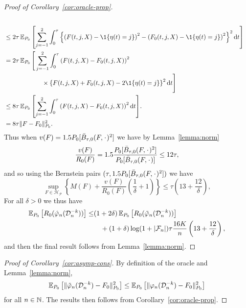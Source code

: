 \begin{proof}[Proof of Corollary~\ref{cor:oracle-prop}]
\begin{align*}
  \\
  & \leq
    2\tau\E_{P_0}{\left[
    \sum_{j=-1}^{2} \int_0^{\tau}
    \left\{
    \left(
    F(t, j, X) - \1{\{\eta(t) = j\}}
    \right)^2
    -
    \left(
    F_0(t, j, X) - \1{\{\eta(t) = j\}}
    \right)^2
    \right\}^2
    \diff t 
    \right]}
  \\
  & =2\tau
    \E_{P_0}\Bigg[
    \sum_{j=-1}^{2} \int_0^{\tau}
    \left(
    F(t, j, X) - F_0(t, j, X)
    \right)^2
  \\
  & \quad \quad \quad\quad \quad \quad \times
    \left\{
    F(t, j, X) +  F_0(t, j, X)-2 \1{\{\eta(t) = j\}}
    \right\}^2
    \diff t 
    \Bigg]
  \\
  & \leq
    8\tau \E_{P_0}{\left[
    \sum_{j=-1}^{2} \int_0^{\tau}
    \left(
    F(t, j, X) - F_0(t, j, X)
    \right)^2
    \diff t 
    \right]}.
  \\
  & =
    8\tau \Vert F - F_0 \Vert_{P_0}^2.
\end{align*}
Thus when \( v(F) = 1.5 P_0{[\bar{B}_{\tau,0}(F, \blank)^2]} \) we have by
Lemma~\ref{lemma:norm}
\begin{equation*}
  \frac{v(F)}{R_0(F)}
  = 1.5 \frac{P_0{[\bar{B}_{\tau,0}(F, \blank)^2]}}{P_0{[\bar{B}_{\tau,0}(F, \blank)]}}
  \leq 12 \tau,
\end{equation*}
and so using the Bernstein pairs \( (\tau, 1.5 P_0{[\bar{B}_{\tau,0}(F, \blank)^2]}) \) we have
\begin{equation*}
  \sup_{F \in \mathcal{H}_{\mathcal{P}}}
  \left\{
    M(F) + \frac{v(F)}{R_0(F)}
    \left(
      \frac{1}{\delta} + 1
    \right)
  \right\}
  \leq \tau
  \left(
    13 + \frac{12}{\delta}
  \right),
\end{equation*}
For all $\delta>0$ we thus have
\begin{align*}
  \operatorname{\mathbb{E}}_{P_0}{\left[ R_0(\hat{\varphi}_n(\mathcal{D}_n^{-k})) \right]}
  \leq
  &(1+2\delta)\operatorname{\mathbb{E}}_{P_0}{\left[ R_0(\tilde{\varphi}_n(\mathcal{D}_n^{-k})) \right]}
  \\
  & \quad
    + (1+\delta)\log(1 + |\mathcal{F}_n|) \tau \frac{16 K}{n}
    \left(
    13 + \frac{12}{\delta}
    \right),
\end{align*}
and then the final result follows from Lemma~\ref{lemma:norm}.
\end{proof}

\begin{proof}[Proof of Corollary~\ref{cor:asymp-cons}]
  By definition of the oracle and Lemma~\ref{lemma:norm},
  \begin{equation*}
    \operatorname{\mathbb{E}}_{P_0}{\left[ \Vert \tilde{\varphi}_n(\mathcal{D}_n^{-k}) - F_0 \Vert_{P_0}^2
      \right]} \leq \operatorname{\mathbb{E}}_{P_0}{\left[ \Vert \varphi_n(\mathcal{D}_n^{-k}) - F_0 \Vert_{P_0}^2
      \right]}  
  \end{equation*}
  for all \( n \in \mathbb{N} \). The results then follows from
  Corollary~\ref{cor:oracle-prop}.
\end{proof}



